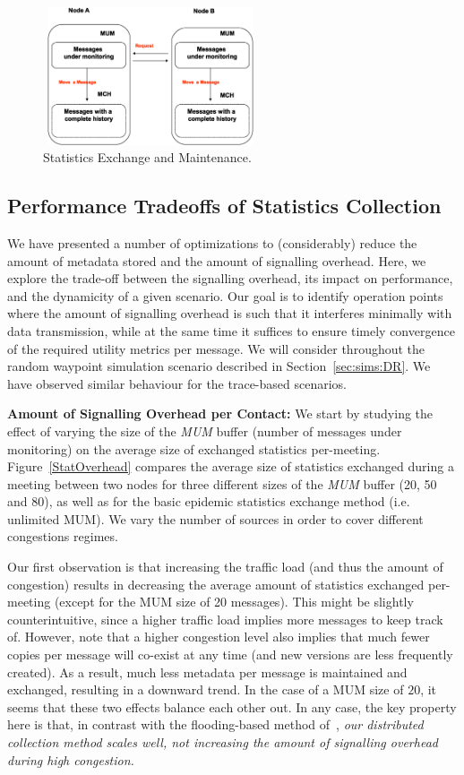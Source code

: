 \begin{figure}[!h]
\centering
\includegraphics[width=2.5in,height=1.6in]{Chapitre3/StatisticsExchanging.eps}
\caption{Statistics Exchange and Maintenance.}
\label{SE}
\end{figure}

\subsection{Performance Tradeoffs of Statistics Collection}
\label{PENHCM}

We have presented a number of optimizations to (considerably) reduce the amount of metadata stored and the amount of signalling overhead. Here, we explore the trade-off between the signalling overhead, its impact on performance, and the dynamicity of a given scenario. Our goal is to identify operation points where the amount of signalling overhead is such that it interferes minimally with data transmission, while at the same time it suffices to ensure timely convergence of the required utility metrics per message. We will consider throughout the random waypoint simulation scenario described in Section~\ref{sec:sims:DR}. We have observed similar behaviour for the trace-based scenarios.

\textbf{Amount of Signalling Overhead per Contact:} We start by studying the effect of varying the size of the \emph{MUM} buffer (number of messages under monitoring) on the average size of exchanged statistics per-meeting. Figure~\ref{StatOverhead} compares the average size of statistics exchanged during a meeting between two nodes for three different sizes of the \emph{MUM} buffer (20, 50 and 80), as well as for the basic epidemic statistics exchange method (i.e. unlimited MUM). We vary the number of sources in order to cover different congestions regimes.

Our first observation is that increasing the traffic load (and thus the amount of congestion) results in decreasing the average amount of statistics exchanged per-meeting (except for the MUM size of 20 messages). This might be slightly counterintuitive, since a higher traffic load implies more messages to keep track of. However, note that a higher congestion level also implies that much fewer copies per message will co-exist at any time (and new versions are less frequently created). As a result, much less metadata per message is maintained and exchanged, resulting in a downward trend. In the case of a MUM size of $20$, it seems that these two effects balance each other out. In any case, the key property here is that, in contrast with the flooding-based method of~\cite{Levine:Sigcomm07}, \emph{our distributed collection method scales well, not increasing the amount of signalling overhead during high congestion.}

